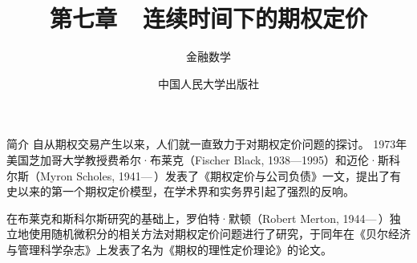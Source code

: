 \documentclass[t]{beamer}
\begin{document}
\fontsize{11}{18}\selectfont


\CTEXindent



  \title{第七章~~连续时间下的期权定价}
\author{金融数学}
\date{中国人民大学出版社}
  \begin{frame}
    \maketitle
  \end{frame}

\begin{frame}{简介}
	自从期权交易产生以来，人们就一直致力于对期权定价问题的探讨。
	1973年美国芝加哥大学教授费希尔·布莱克（Fischer Black, 1938---1995）和迈伦·斯科尔斯（Myron  Scholes, 1941---\,）发表了《期权定价与公司负债》一文，提出了有史以来的第一个期权定价模型，在学术界和实务界引起了强烈的反响。
	
	在布莱克和斯科尔斯研究的基础上，罗伯特·默顿（Robert Merton, 1944---\,）独立地使用随机微积分的相关方法对期权定价问题进行了研究，于同年在《贝尔经济与管理科学杂志》上发表了名为《期权的理性定价理论》的论文。
\end{frame}
\end{document}
